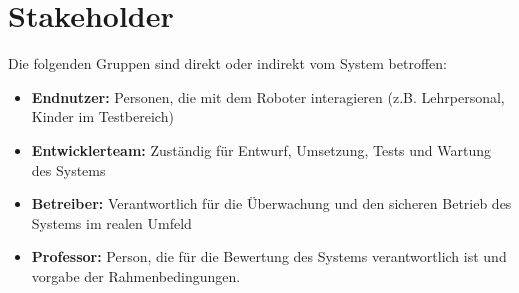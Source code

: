 \clearpage
\section{Stakeholder}
Die folgenden Gruppen sind direkt oder indirekt vom System betroffen:

\begin{itemize}
    \item \textbf{Endnutzer:} Personen, die mit dem Roboter interagieren (z.B. Lehrpersonal, Kinder im Testbereich)
    \item \textbf{Entwicklerteam:} Zuständig für Entwurf, Umsetzung, Tests und Wartung des Systems
    \item \textbf{Betreiber:} Verantwortlich für die Überwachung und den sicheren Betrieb des Systems im realen Umfeld
    \item \textbf{Professor:} Person, die für die Bewertung des Systems verantwortlich ist und vorgabe der Rahmenbedingungen.

\end{itemize}




